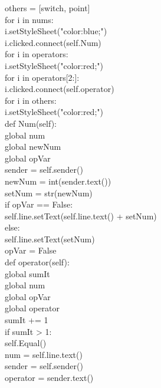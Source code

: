         others = [switch, point]\\

for i in nums:\\
            i.setStyleSheet("color:blue;")\\
            i.clicked.connect(self.Num)\\

        for i in operators:\\
            i.setStyleSheet("color:red;")\\
        for i in operators[2:]:\\
            i.clicked.connect(self.operator)\\
        for i in others:\\
            i.setStyleSheet("color:red;")\\
def Num(self):\\
        global num\\
        global newNum\\
        global opVar\\

        sender = self.sender()\\

        newNum = int(sender.text())\\
        setNum = str(newNum)\\

        if opVar == False:\\
            self.line.setText(self.line.text() + setNum)\\
        else:\\
            self.line.setText(setNum)\\
            opVar = False\\

    def operator(self):\\
        global sumIt\\
        global num\\
        global opVar\\
        global operator\\

        sumIt += 1\\

if sumIt > 1:\\
            self.Equal()\\

        num = self.line.text()\\
        sender = self.sender()\\
        operator = sender.text()\\

